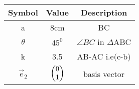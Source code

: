\begin{tabular}{|c|c|c|}
  \hline
  \textbf{Symbol}&\textbf{Value}&\textbf{Description}\\
  \hline
  a & 8cm & BC\\
  \hline
  $\theta$ & $45^0$ & $\angle{BC}$ in $\Delta$ABC \\
  \hline
	k & 3.5 & AB-AC i.e(c-b)\\
  \hline 
	$\vec{e}_2$ & $\begin{pmatrix}
			0\\
			1\\
			\end{pmatrix}$ & basis vector\\
 \hline			
\end{tabular}
